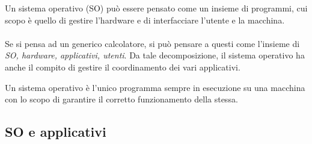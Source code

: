 Un sistema operativo (SO) può essere pensato come un insieme di programmi, cui scopo è quello di gestire l'hardware e di interfacciare l'utente e la macchina.
\\ \\
Se si pensa ad un generico calcolatore, si può pensare a questi come l'insieme di \emph{SO, hardware, applicativi, utenti}.
Da tale decomposizione, il sistema operativo ha anche il compito di gestire il coordinamento dei vari applicativi.
\begin{Definition*}
    Un sistema operativo è l'unico programma sempre in esecuzione su una macchina con lo scopo di garantire il corretto funzionamento della stessa.
\end{Definition*}

\subsection{SO e applicativi}
